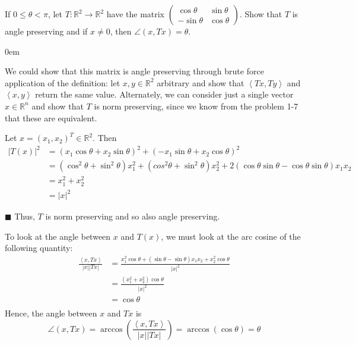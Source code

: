 \documentclass[12pt]{article}
\renewcommand{\qed}{\hfill$\blacksquare$}
\renewenvironment{proof}{\begin{addmargin}[1em]{0em}\begin{newproof}}{\end{newproof}\end{addmargin}\qed}
\newenvironment{problem}[2][Problem]{\begin{trivlist}
\item[\hskip \labelsep {\bfseries #1}\hskip \labelsep {\bfseries #2.}]}{\end{trivlist}}
\begin{document}
\begin{problem}{1.9}
If $0 \leq \theta < \pi$, let $T: \mathbb{R}^2 \rightarrow \mathbb{R}^2$ have the matrix $\left( \begin{array}{rr} \cos \theta & \sin \theta \\ -\sin \theta & \cos \theta \end{array} \right)$. Show that $T$ is angle preserving and if $x\neq 0$, then $\angle \left(x, Tx\right) = \theta $.
\end{problem}

\begin{proof}
We could show that this matrix is angle preserving through brute force application of the definition: let $x,y \in \mathbb{R}^2$ arbitrary and show that $\left\langle Tx,Ty\right\rangle$ and $\left\langle x,y \right\rangle$ return the same value. Alternately, we can consider just a single vector $x\in \mathbb{R}^n$ and show that $T$ is norm preserving, since we know from the problem 1-7 that these are equivalent.

Let $x = \left(x_1,x_2\right)^T \in \mathbb{R}^2$. Then 
\begin{equation*}
\begin{split}
\left| T\left(x\right)\right|^2 & = \left(x_1 \cos \theta + x_2 \sin \theta \right)^2 + \left(-x_1 \sin \theta + x_2 \cos \theta \right)^2  \\ 
& = \left(\cos^2 \theta + \sin^2 \theta \right) x_1^2 + \left(cos^2 \theta + \sin^2 \theta \right) x_2^2 + 2\left(\cos \theta \sin \theta - \cos \theta \sin \theta \right) x_1 x_2 \\
& = x_1^2 + x_2^2 \\
& = \left|x\right|^2
\end{split}
\end{equation*}
\end{proof}
Thus, $T$ is norm preserving and so also angle preserving. 

To look at the angle between $x$ and $T\left(x\right)$, we must look at the arc cosine of the following quantity:
\begin{equation*}
\begin{split}
\frac{\left\langle x,Tx\right\rangle}{\left|x\right|\left|Tx\right|} & = \frac{x_1^2 \cos \theta +\left(\sin \theta - \sin \theta\right)x_1x_2 + x_2^2 \cos \theta}{\left|x\right|^2}\\
& = \frac{\left(x_1^2 + x_2^2\right) \cos \theta}{\left|x\right|^2} \\
& = \cos \theta \\
\end{split}
\end{equation*}
Hence, the angle between $x$ and $Tx$ is
\begin{equation*}
\angle \left(x,Tx\right) = \arccos \left( \frac{\left\langle x, Tx\right\rangle }{\left|x\right|\left|Tx\right|} \right) = \arccos \left(\cos \theta \right) = \theta 
\end{equation*}
\end{document}
